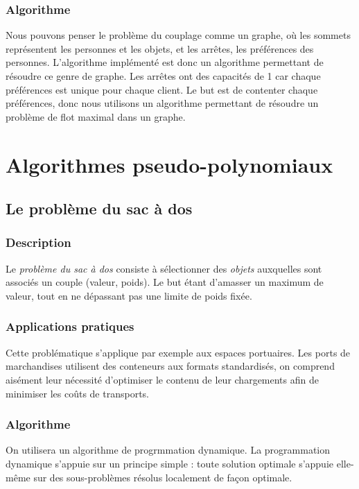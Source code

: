         \subsubsection{Algorithme}
		Nous pouvons penser le problème du couplage comme un graphe,
		 où les sommets représentent les personnes et les objets,
		 et les arrêtes, les préférences des personnes.
		L'algorithme implémenté est donc un algorithme permettant
		 de résoudre ce genre de graphe.
		Les arrêtes ont des capacités de 1 car chaque préférences est unique
		 pour chaque client.
		Le but est de contenter chaque préférences, donc nous utilisons un
		 algorithme permettant de résoudre un problème de flot maximal
		 dans un graphe.



\section{Algorithmes pseudo-polynomiaux}
    \subsection{Le problème du sac à dos}
        \subsubsection{Description}
            Le \emph{problème du sac à dos} consiste à sélectionner
            des \emph{objets} auxquelles sont associés un couple (valeur, poids).
            Le but étant d'amasser un maximum de valeur, tout en ne dépassant
            pas une limite de poids fixée.
        \subsubsection{Applications pratiques}
            Cette problématique s'applique par exemple aux espaces portuaires.
            Les ports de marchandises utilisent des conteneurs aux formats standardisés,
            on comprend aisément leur nécessité d'optimiser le contenu de leur
            chargements afin de minimiser les coûts de transports.
        \subsubsection{Algorithme}
            On utilisera un algorithme de progrmmation dynamique. La programmation dynamique s'appuie sur un principe simple :
	    toute solution optimale s'appuie elle-même sur des sous-problèmes résolus localement de façon optimale.



